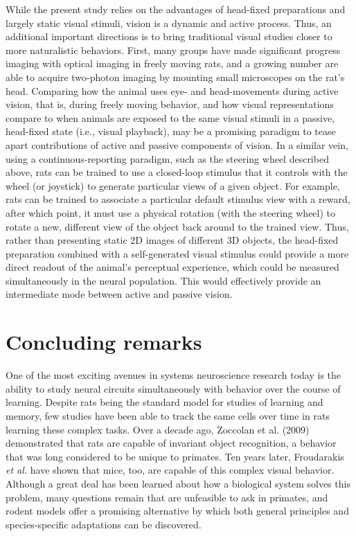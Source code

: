 While the present study relies on the advantages of head-fixed preparations and largely static visual stimuli, vision is a dynamic and active process. Thus, an additional important directions is to bring traditional visual studies closer to more naturalistic behaviors. First, many groups have made significant progress imaging with optical imaging in freely moving rats, and a growing number are able to acquire two-photon imaging by mounting small microscopes on the rat's head. Comparing how the animal uses eye- and head-movements during active vision, that is, during freely moving behavior, and how visual representations compare to when animals are exposed to the same visual stimuli in a passive, head-fixed state (i.e., visual playback), may be a promising paradigm to tease apart contributions of active and passive components of vision. In a similar vein, using a continuous-reporting paradigm, such as the steering wheel described above, rats can be trained to use a closed-loop stimulus that it controls with the wheel (or joystick) to generate particular views of a given object. For example, rats can be trained to associate a particular default stimulus view with a reward, after which point, it must use a physical rotation (with the steering wheel) to rotate a new, different view of the object back around to the trained view. Thus, rather than presenting static 2D images of different 3D objects, the head-fixed preparation combined with a self-generated visual stimulus could provide a more direct readout of the animal's perceptual experience, which could be measured simultaneously in the neural population. This would effectively provide an intermediate mode between active and passive vision.


\section{Concluding remarks}
One of the most exciting avenues in systems neuroscience research today is the ability to study neural circuits simultaneously with behavior over the course of learning. Despite rats being the standard model for studies of learning and memory, few studies have been able to track the same cells over time in rats learning these complex tasks. Over a decade ago, Zoccolan et al. (2009) demonstrated that rats are capable of invariant object recognition, a behavior that was long considered to be unique to primates. Ten years later, Froudarakis \textit{et al.} have shown that mice, too, are capable of this complex visual behavior\cite{Froudarakis2020}. Although a great deal has been learned about how a biological system solves this problem, many questions remain that are unfeasible to ask in primates, and rodent models offer a promising alternative by which both general principles and species-specific adaptations can be discovered. 

